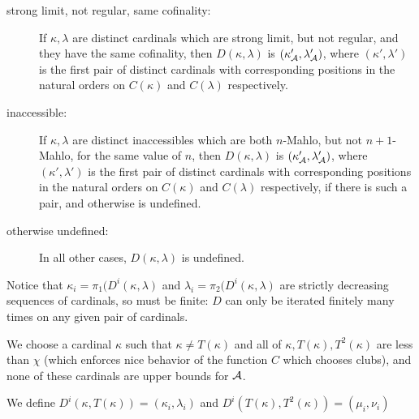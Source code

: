 \documentclass{slides}
\begin{document}
\begin{description}

\item[strong limit, not regular, same cofinality:]  If $\kappa,\lambda$ are distinct cardinals which are strong limit, but not regular, and they have the same cofinality, then
$D(\kappa,\lambda)$ is  $(\kappa'_{\cal A},\lambda'_{\cal A})$, where $(\kappa',\lambda')$ is the first pair of distinct cardinals with corresponding positions in the natural orders on $C(\kappa)$ and $C(\lambda)$ respectively.

\item[inaccessible:]  If $\kappa,\lambda$ are distinct inaccessibles which are both $n$-Mahlo, but not $n+1$-Mahlo, for the same value of $n$, then $D(\kappa,\lambda)$ is  $(\kappa'_{\cal A},\lambda'_{\cal A})$, where $(\kappa',\lambda')$ is the first pair of distinct cardinals with corresponding positions in the natural orders on $C(\kappa)$ and $C(\lambda)$ respectively, if there is such a pair, and otherwise is undefined.

\item[otherwise undefined:]  In all other cases, $D(\kappa,\lambda)$ is undefined.

\end{description}

\begin{slide}

Notice that $\kappa_i = \pi_1(D^i(\kappa,\lambda)$ and $\lambda_i = \pi_2(D^i(\kappa,\lambda)$ are strictly decreasing sequences of cardinals, so must be finite:  $D$ can only be iterated finitely many times on any given pair of cardinals.

We choose a cardinal $\kappa$ such that $\kappa \neq T(\kappa)$ and all of $\kappa, T(\kappa), T^2(\kappa)$ are less than $\chi$ (which enforces nice behavior of the function $C$ which chooses clubs), and none of these cardinals are upper bounds for $\cal A$.

We define $D^i(\kappa,T(\kappa)) = (\kappa_i,\lambda_i)$ and $D^i(T(\kappa),T^2(\kappa)) = (\mu_i,\nu_i)$


\end{slide}
\end{document}
